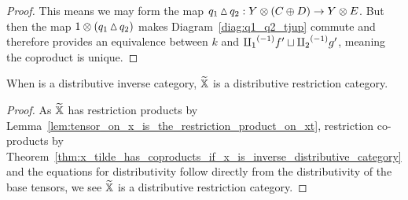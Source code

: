 \begin{proof}
  This means we may form the map $q_1\operatorname{\vartriangle} q_2:Y\otimes(C\oplus D) \to Y\otimes E$. But then the map
  $1\otimes(q_1\operatorname{\vartriangle}  q_2)$  makes Diagram~\ref{diag:q1_q2_tjup} commute and therefore provides an
  equivalence between $k$ and ${\amalg_{1}}^{(-1)} f' \sqcup {\amalg_{2}}^{(-1)} g'$, meaning the coproduct is unique.



\end{proof}

\begin{corollary}\label{cor:xt_is_a_distributive_restriction_category}
  When \X is a distributive inverse category, $\widetilde{\mathbb{X}}$ is a distributive restriction category.
\end{corollary}
\begin{proof}
  As $\widetilde{\mathbb{X}}$ has restriction products by Lemma~\ref{lem:tensor_on_x_is_the_restriction_product_on_xt},
  restriction co-products by
  Theorem~\ref{thm:x_tilde_has_coproducts_if_x_is_inverse_distributive_category} and the equations
  for distributivity follow directly from the distributivity of the base tensors, we see $\widetilde{\mathbb{X}}$ is a
  distributive restriction category.
\end{proof}

